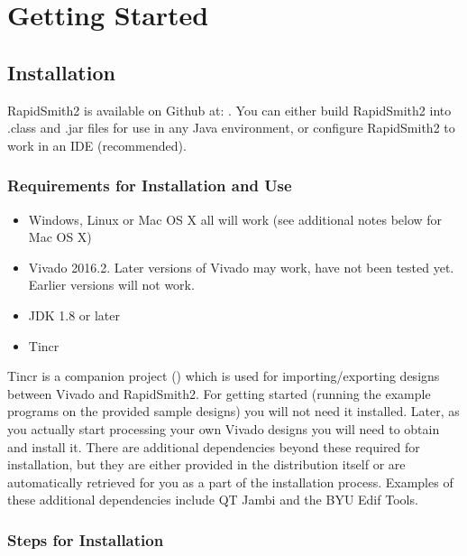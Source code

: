 \newpage
\section{Getting Started}

\subsection{Installation}

RapidSmith2 is available on Github at:
{}.
You can either build RapidSmith2 into .class and .jar files for use in any Java
environment, or configure RapidSmith2 to work in an IDE (recommended).

\subsubsection{Requirements for Installation and Use}
\begin{itemize}
  \item Windows, Linux or Mac OS X all will work (see additional notes below for
  Mac OS X)
  \item Vivado 2016.2. Later versions of Vivado may work, have not been tested
  yet. Earlier versions will not work.
  \item JDK 1.8 or later
  \item Tincr 
\end{itemize}

Tincr is a companion project
({}) which is used for
importing/exporting designs between Vivado and RapidSmith2.  For getting started (running the example programs on the provided sample designs) you will not need it installed.
Later, as you  actually start processing your own Vivado designs you will need
to obtain and install it. There are additional dependencies beyond these
required for installation, but they are either provided in the distribution
itself or are automatically retrieved for you as a part of the installation process. 
Examples of these additional dependencies include QT Jambi and the BYU Edif
Tools.
 
\subsubsection{Steps for Installation}

